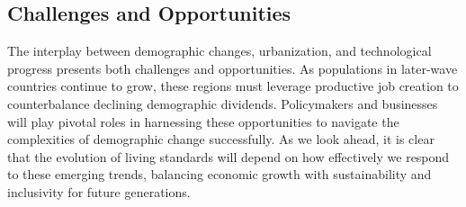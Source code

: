 \documentclass[12pt]{article}
\begin{document}
\subsection{Challenges and Opportunities}
The interplay between demographic changes, urbanization, and technological
progress presents both challenges and opportunities. As populations in later-wave
countries continue to grow, these regions must leverage productive job creation to
counterbalance declining demographic dividends. Policymakers and businesses will
play pivotal roles in harnessing these opportunities to navigate the complexities of
demographic change successfully.
As we look ahead, it is clear that the evolution of living standards will depend on how
effectively we respond to these emerging trends, balancing economic growth with
sustainability and inclusivity for future generations.
\end{document}
